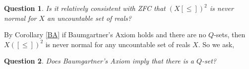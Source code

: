 \documentclass[11pt]{amsart}
\newtheorem{que}{Question}
\theoremstyle{definition}
\theoremstyle{remark}
\theoremstyle{plain}
\begin{document}
\begin{que} Is it relatively consistent with ZFC that $(X[\leq])^2$ is never normal for $X$ an uncountable set of reals?
\end{que}

By Corollary \ref{BA} if Baumgartner's Axiom holds and there are no $Q$-sets, then $X([\leq])^2$ is never normal for any uncountable set of reals $X$. So we ask, 
\begin{que} Does Baumgartner's Axiom imply that there is a $Q$-set?
\end{que}





\end{document}
